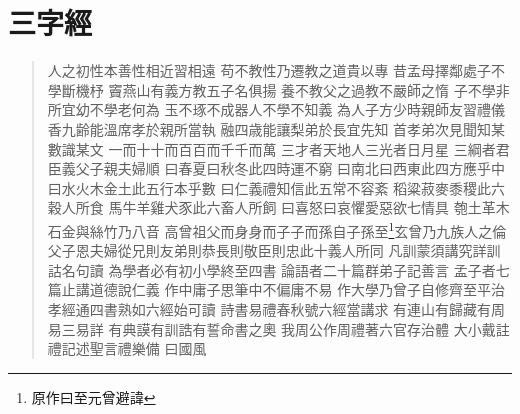 
\chapter{三字經}

\begin{verse}
     人之初性本善性相近習相遠
     苟不教性乃遷教之道貴以專
     昔孟母擇鄰處子不學斷機杼
     竇燕山有義方教五子名俱揚
     養不教父之過教不嚴師之惰
     子不學非所宜幼不學老何為
     玉不琢不成器人不學不知義
     為人子方少時親師友習禮儀
     香九齢能溫席孝於親所當執
     融四歳能讓梨弟於長宜先知
     首孝弟次見聞知某數識某文
     一而十十而百百而千千而萬
     三才者天地人三光者日月星
     三綱者君臣義父子親夫婦順
     曰春夏曰秋冬此四時運不窮
     曰南北曰西東此四方應乎中
     曰水火木金土此五行本乎數
     曰仁義禮知信此五常不容紊
     稻粱菽麥黍稷此六穀人所食
     馬牛羊雞犬豕此六畜人所飼
     曰喜怒曰哀懼愛惡欲七情具
     匏土革木石金與絲竹乃八音
     高曾祖父而身身而子子而孫自子孫至\footnote{原作曰至元曾避諱}玄曾乃九族人之倫
     父子恩夫婦從兄則友弟則恭長則敬臣則忠此十義人所同
     凡訓蒙須講究詳訓詁名句讀
     為學者必有初小學終至四書
     論語者二十篇群弟子記善言
     孟子者七篇止講道德說仁義
     作中庸子思筆中不偏庸不易
     作大學乃曾子自修齊至平治
     孝經通四書熟如六經始可讀
     詩書易禮春秋號六經當講求
     有連山有歸藏有周易三易詳
     有典謨有訓誥有誓命書之奧
     我周公作周禮著六官存治體
     大小戴註禮記述聖言禮樂備
     曰國風
\end{verse}

